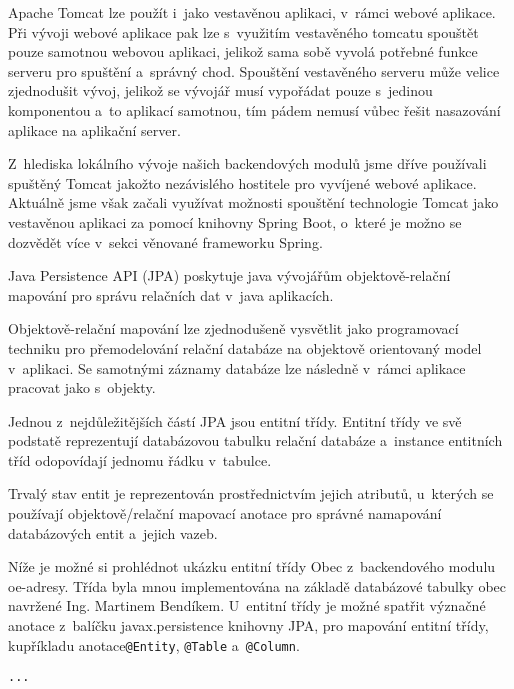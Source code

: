 \documentclass[12pt]{article}
\begin{document}
{Apache Tomcat lze použít i~jako vestavěnou aplikaci, v~rámci webové aplikace.
Při vývoji webové aplikace pak lze s~využitím vestavěného tomcatu
spouštět pouze samotnou webovou aplikaci, jelikož sama sobě vyvolá
potřebné funkce serveru pro spuštění a~správný chod.
Spouštění vestavěného serveru může velice zjednodušit vývoj,
jelikož se vývojář musí vypořádat pouze s~jedinou komponentou a~to aplikací samotnou,
tím pádem nemusí vůbec řešit nasazování aplikace na aplikační server.
\cite{javaWorld}

Z~hlediska lokálního vývoje našich backendových modulů jsme dříve používali 
spuštěný Tomcat jakožto nezávislého hostitele pro vyvíjené webové aplikace.
Aktuálně jsme však začali využívat možnosti spouštění technologie Tomcat jako vestavěnou
aplikaci za pomocí knihovny Spring Boot, o~které je možno se dozvědět více v~sekci
věnované frameworku Spring.

Java Persistence API (JPA) poskytuje java vývojářům
objektově-relační mapování pro správu relačních dat v~java aplikacích.

Objektově-relační mapování lze zjednodušeně vysvětlit jako
programovací techniku pro přemodelování relační databáze
na objektově orientovaný model v~aplikaci.
Se samotnými záznamy databáze lze následně v~rámci aplikace pracovat jako s~objekty.


Jednou z~nejdůležitějších částí JPA jsou entitní třídy.
Entitní třídy ve svě podstatě reprezentují databázovou tabulku
relační databáze a~instance entitních tříd odopovídají jednomu řádku v~tabulce.

Trvalý stav entit je reprezentován prostřednictvím jejich atributů,
u~kterých se používají objektově/relační mapovací anotace 
pro správné namapování databázových entit a~jejich vazeb.

Níže je možné si prohlédnot ukázku entitní třídy Obec z~backendového 
modulu oe-adresy. Třída byla mnou implementována na základě databázové tabulky 
obec navržené Ing. Martinem Bendíkem. U~entitní třídy je možné spatřit
význačné anotace z~balíčku javax.persistence knihovny JPA,
pro mapování entitní třídy, kupříkladu anotace\texttt{@Entity}, \texttt{@Table}
a~\texttt{@Column}. 

\begin{lstlisting}
...


\end{lstlisting}}
\end{document}
